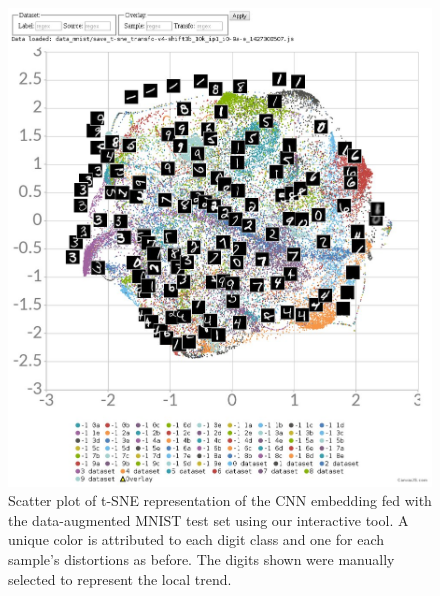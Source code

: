 \documentclass[a4paper,12pt]{report}
\begin{document}
\begin{figure}[t]
    \begin{center}
        \includegraphics[width=\textwidth]{thesis_figures/mnist_da_tsne.jpg}
    \end{center}
    \caption{Scatter plot of t-SNE representation of the CNN embedding fed with the data-augmented MNIST test set using our interactive tool. A unique color is attributed to each digit class and one for each sample's distortions as before. The digits shown were manually selected to represent the local trend.}
    \label{fig:mnist_da_tsne}
\end{figure}
\end{document}
